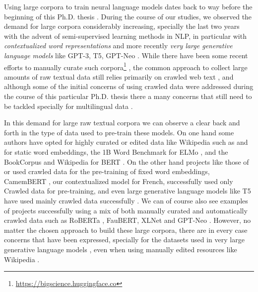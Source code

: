 Using large corpora to train neural language models dates back to way before the beginning of this Ph.D. thesis \citep{schwenk-gauvain-2005-training}. During the course of our studies, we observed the demand for large corpora considerably increasing, specially the last two years with the advent of semi-supervised learning methods in NLP, in particular with \emph{contextualized word representations} \citep{howard-ruder-2018-universal,peters-etal-2018-deep,devlin-etal-2019-bert} and more recently \emph{very large generative language models} like GPT-3, T5, GPT-Neo \citep{raffel-etal-2020-exploring,brown-etal-2020-language,black-etal-2021-gpt}. While there have been some recent efforts to manually curate such corpora\footnote{\url{https://bigscience.huggingface.co}} \citep{gao-etal-2020-pile}, the common approach to collect large amounts of raw textual data still relies primarily on crawled web text \citep{ortiz-suarez-etal-2019-asynchronous,ortiz-suarez-etal-2020-monolingual,xue-etal-2021-mt5,el-kishky-etal-2020-ccaligned,espla-etal-2019-paracrawl,banon-etal-2020-paracrawl,gao-etal-2020-pile}, and although some of the initial concerns of using crawled data \citep{trinh-le-2018-a,radford-etal-2019-language} were addressed during the course of this particular Ph.D. thesis \citep{ortiz-suarez-etal-2020-monolingual,martin-etal-2020-camembert} there a many concerns that still need to be tackled \citep{caswell-etal-2020-language} specially for multilingual data \citep{kreutzer-etal-2021-quality}.

In this demand for large raw textual corpora we can observe a clear back and forth in the type of data used to pre-train these models. On one hand some authors have opted for highly curated or edited data like Wikipedia such as \citet{al-rfou-etal-2013-polyglot} and \citet{bojanowski-etal-2017-enriching} for static word embeddings, the 1B Word Benchmark \citep{chelba-etal-2014-one} for ELMo \citep{peters-etal-2018-deep}, and the BookCorpus \citep{zhu-etal-2015-aligning} and Wikipedia for BERT \citep{devlin-etal-2019-bert}. On the other hand projects like those of \citet{pennington-etal-2014-glove} or \citet{grave-etal-2018-learning} used crawled data for the pre-training of fixed word embeddings, CamemBERT \citep{martin-etal-2020-camembert}, our contextualized model for French, successfully used only Crawled data for pre-training, and even large generative language models like T5 have used mainly crawled data successfully \citep{raffel-etal-2020-exploring}. We can of course also see examples of projects successfully using a mix of both manually curated and automatically crawled data such as RoBERTa \citep{liu-etal-2019-roberta}, FauBERT\citep{le-etal-2020-flaubert-unsupervised}, XLNet \citep{yang-etal-2019-xlnet} and GPT-Neo \citep{black-etal-2021-gpt,gao-etal-2020-pile}. However, no matter the chosen approach to build these large corpora, there are in every case concerns that have been expressed, specially for the datasets used in very large generative language models \citep{bender-etal-2021-on}, even when using manually edited resources like Wikipedia \citep{barera-2020-mind}.


